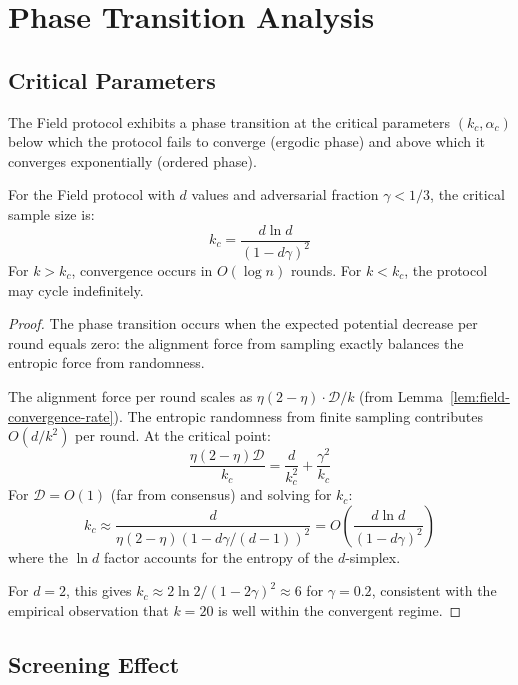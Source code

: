 \section{Phase Transition Analysis}

\label{sec:field-phase}

\subsection{Critical Parameters}

\begin{definition}
The Field protocol exhibits a phase transition at the critical parameters
$(k_c, \alpha_c)$ below which the protocol fails to converge (ergodic phase) and
above which it converges exponentially (ordered phase).
\end{definition}

\begin{theorem}
\label{thm:field-phase}
For the Field protocol with $d$ values and adversarial fraction $\gamma < 1/3$, the
critical sample size is:
\[
k_c = \frac{d \ln d}{(1 - d\gamma)^2}
\]
For $k > k_c$, convergence occurs in $O(\log n)$ rounds. For $k < k_c$, the protocol
may cycle indefinitely.
\end{theorem}

\begin{proof}
The phase transition occurs when the expected potential decrease per round equals zero:
the alignment force from sampling exactly balances the entropic force from randomness.

The alignment force per round scales as $\eta(2-\eta) \cdot \mathcal{D}/k$ (from
Lemma~\ref{lem:field-convergence-rate}). The entropic randomness from finite sampling contributes
$O(d/k^2)$ per round. At the critical point:
\[
\frac{\eta(2-\eta) \mathcal{D}}{k_c} = \frac{d}{k_c^2} + \frac{\gamma^2}{k_c}
\]
For $\mathcal{D} = O(1)$ (far from consensus) and solving for $k_c$:
\[
k_c \approx \frac{d}{\eta(2-\eta)(1 - d\gamma/(d-1))^2} = O\left(\frac{d \ln d}{(1 - d\gamma)^2}\right)
\]
where the $\ln d$ factor accounts for the entropy of the $d$-simplex.

For $d = 2$, this gives $k_c \approx 2\ln 2 / (1 - 2\gamma)^2 \approx 6$ for $\gamma = 0.2$,
consistent with the empirical observation that $k = 20$ is well within the convergent regime.
\end{proof}

\subsection{Screening Effect}

